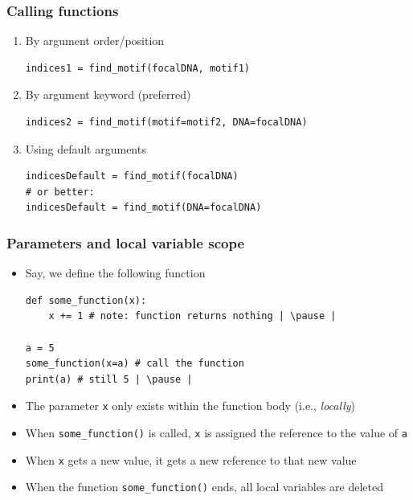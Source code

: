 \documentclass[xcolor=table]{beamer}
\begin{document}
\begin{frame}[fragile]
\frametitle{Calling functions}


\begin{enumerate}\addtolength{\itemsep}{-0.4\baselineskip}
\begin{lstlisting}[style=python]
# Example
motif1 = "ggatcc" # sequence to search for
motif2 = "aacctg" # another sequence to search for
focalDNA = "acgtgtaaccaaggatccacccgttttaaacctgtgtgggatcc"
\end{lstlisting}
\vspace{-0.5cm}
\item<1-> By argument order/position
\begin{lstlisting}[style=python]
indices1 = find_motif(focalDNA, motif1)
\end{lstlisting}

\item<2-> By argument keyword (preferred)
\begin{lstlisting}[style=python]
indices2 = find_motif(motif=motif2, DNA=focalDNA)
\end{lstlisting}

\item<3-> Using default arguments
\begin{lstlisting}[style=python]
indicesDefault = find_motif(focalDNA)
# or better:
indicesDefault = find_motif(DNA=focalDNA)
\end{lstlisting}

\end{enumerate}

\end{frame}


\begin{frame}[fragile]
\frametitle{Parameters and local variable scope}
\begin{itemize}
    \item Say, we define the following function
\begin{lstlisting}[style=python]
def some_function(x):  
    x += 1 # note: function returns nothing | \pause |

a = 5 
some_function(x=a) # call the function
print(a) # still 5 | \pause |
\end{lstlisting}
    \item The parameter \texttt{x} only exists within the function body (i.e., \emph{locally})  \pause
    \item When \texttt{some\_function()} is called, \texttt{x} is assigned the reference to the value of \texttt{a} 
    \item When \texttt{x} gets a new value, it gets a new reference to that new value
    \item When the function \texttt{some\_function()} ends, all local variables are deleted \pause
\end{itemize}
\end{frame}
\end{document}
